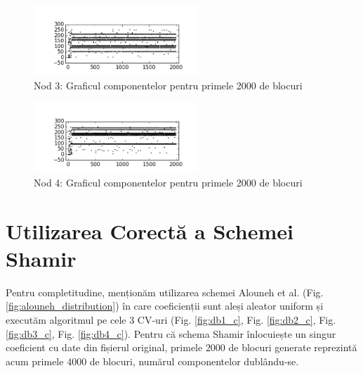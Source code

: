 \documentclass[oneside, 12pt]{book}
\begin{document}
\begin{figure}[h!]
\begin{center}
\includegraphics[width=0.55\textwidth]{img/carouri_db3.png}    %
\caption{Nod 3: Graficul componentelor pentru primele 2000 de blocuri} 
\label{fig:carouri_db3}
\end{center}
\end{figure}

\begin{figure}[t!]
\begin{center}
\includegraphics[width=0.55\textwidth]{img/carouri_db4.png}    %
\caption{Nod 4: Graficul componentelor pentru primele 2000 de blocuri} 
\label{fig:carouri_db4}
\end{center}
\end{figure}

\clearpage
\section{Utilizarea Corectă a Schemei Shamir}

Pentru completitudine, menționăm utilizarea schemei Alouneh et al. (Fig. \ref{fig:alouneh_distribution}) în care coeficienții sunt aleși aleator uniform și executăm algoritmul pe cele $3$ CV-uri (Fig. \ref{fig:db1_c}, Fig. \ref{fig:db2_c}, Fig. \ref{fig:db3_c}, Fig. \ref{fig:db4_c}). Pentru că schema Shamir înlocuiește un singur coeficient cu date din fișierul original, primele $2000$ de blocuri generate reprezintă acum primele $4000$ de blocuri, numărul componentelor dublându-se.
\end{document}
